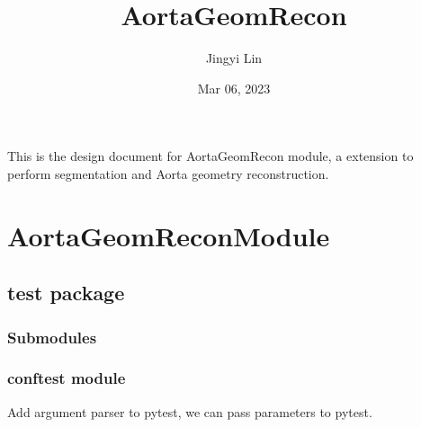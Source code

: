 \documentclass[letterpaper,10pt,english]{sphinxmanual}
\title{AortaGeomRecon}
\date{Mar 06, 2023}
\author{Jingyi Lin}
\begin{document}
\pagestyle{empty}
\sphinxmaketitle
\pagestyle{plain}
\sphinxtableofcontents
\pagestyle{normal}
\label{\detokenize{index::doc}}


\sphinxAtStartPar
This is the design document for AortaGeomRecon module, a {\hyperref[\detokenize{glossary:term-3D-Slicer}]{}} extension to perform {\hyperref[\detokenize{glossary:term-Aorta}]{}} segmentation and Aorta geometry reconstruction.


\chapter{AortaGeomReconModule}
\label{\detokenize{modules:aortageomreconmodule}}\label{\detokenize{modules::doc}}

\section{test package}
\label{\detokenize{test:test-package}}\label{\detokenize{test::doc}}

\subsection{Submodules}
\label{\detokenize{test:submodules}}

\subsection{conftest module}
\label{\detokenize{test:module-conftest}}\label{\detokenize{test:conftest-module}}

\begin{fulllineitems}
\label{\detokenize{test:conftest.pytest_addoption}}
\sphinxAtStartPar
Add argument parser to pytest, we can pass parameters to pytest.

\end{fulllineitems}

\end{document}
